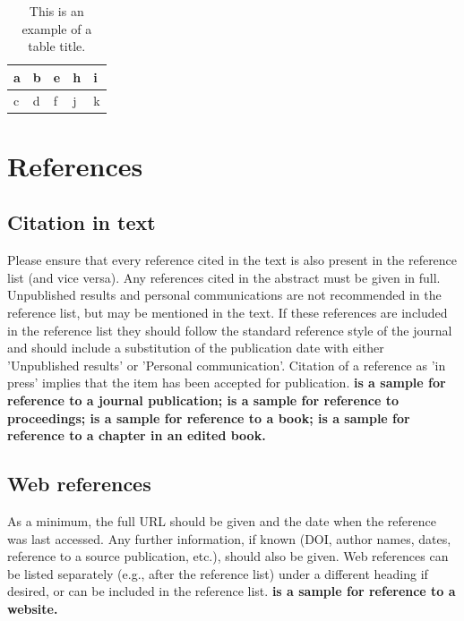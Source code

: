 \documentclass[twocolumn,3p,times,procedia]{elsarticle}
\begin{document}
\begin{table}[h]\footnotesize
\centering
\begin{threeparttable}
\setlength{\abovecaptionskip}{0pt}
\caption{This is an example of a table title.}
\begin{tabular}{p{1.2cm} p{1.2cm} p{1.2cm} p{1.2cm} p{1.2cm}}
\hline
a & b & e & h & i\\
\hline
c & d & f & j & k\\
\hline

\end{tabular}
\end{threeparttable}
\end{table}


\section{References}

\subsection{Citation in text}

Please ensure that every reference cited in the text is also present in the reference list (and vice versa). Any references cited in the abstract must be given in full. Unpublished results and personal communications are not recommended in the reference list, but may be mentioned in the text. If these references are included in the reference list they should follow the standard reference style of the journal and should include a substitution of the publication date with either 'Unpublished results' or 'Personal communication'. Citation of a reference as 'in press' implies that the item has been accepted for publication. \textbf{ \cite{atakan2012body} is a sample for reference to a journal publication; \cite{russu2016secure} is a sample for reference to proceedings; \cite{strunk2000elements} is a sample for reference to a book; \cite{Mettam2009} is a sample for reference to a chapter in an edited book.}

\subsection{Web references}

As a minimum, the full URL should be given and the date when the reference was last accessed. Any further information, if known (DOI, author names, dates, reference to a source publication, etc.), should also be given. Web references can be listed separately (e.g., after the reference list) under a different heading if desired, or can be included in the reference list.  \textbf{ \cite{web} is a sample for reference to a website.}
\end{document}
